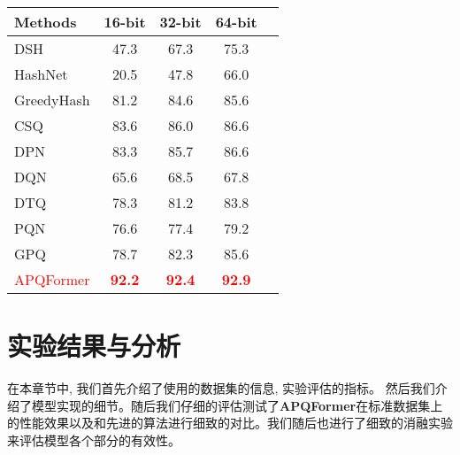   \begin{table}[!htpb]
    \centering
    \begin{tabular}{cccccc}
       \\ \hline
    \multicolumn{2}{l|}{Methods} & 16-bit & 32-bit  & 64-bit   \\\hline
    \multicolumn{2}{l|}{DSH} & 47.3 & 67.3   & 75.3  \\  
    \multicolumn{2}{l|}{HashNet} & 20.5 & 47.8 & 66.0   \\  
    \multicolumn{2}{l|}{GreedyHash} & 81.2 & 84.6 & 85.6   \\  
    \multicolumn{2}{l|}{CSQ} & 83.6 & 86.0 & 86.6  \\  
    \multicolumn{2}{l|}{DPN} &  83.3 & 85.7 & 86.6   \\  
    \hline
    \hline
    \multicolumn{2}{l|}{DQN} & 65.6 & 68.5 & 67.8   \\
    \multicolumn{2}{l|}{DTQ} & 78.3 & 81.2 & 83.8   \\
    \multicolumn{2}{l|}{PQN} & 76.6 & 77.4 & 79.2  \\
    \multicolumn{2}{l|}{GPQ} & 78.7 & 82.3 & 85.6  \\
 
    \hline
    \hline
     \multicolumn{2}{l|}{\textcolor{red}{APQFormer} }&\textcolor{red}{\textbf{92.2}} & \textcolor{red}{\textbf{92.4}} & \textcolor{red}{\textbf{92.9}} \\
     \hline
     \hline
    \end{tabular}
    \label{table:imagenetapq}
  \end{table}

\section{实验结果与分析}
在本章节中, 我们首先介绍了使用的数据集的信息, 实验评估的指标。 然后我们介绍了模型实现的细节。随后我们仔细的评估测试了\textbf{APQFormer}在标准数据集上的性能效果以及和先进的算法进行细致的对比。我们随后也进行了细致的消融实验来评估模型各个部分的有效性。
